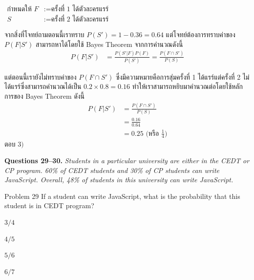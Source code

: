 \documentclass[11pt]{scrartcl}
\newcommand{\groupctx}[2]{\bigskip\noindent\textbf{Questions #1.} \textit{#2}\par\medskip}
\begin{document}
\begin{solutionbox}
  \begin{flushleft}
  $\begin{aligned}
    \text{กำหนดให้ } F &:= \text{ครั้งที่ 1 ได้ตัวละครแรร์} \\
    S &:= \text{ครั้งที่ 2 ได้ตัวละครแรร์}
  \end{aligned}$
  \end{flushleft}

  จากสิ่งที่โจทย์ถามตอนนี้เราทราบ $P(S')=1-0.36=0.64$ แต่โจทย์ต้องการทราบค่าของ $P(F|S')$ สามารถหาได้โดยใช้ Bayes Theorem จากการคำนวณดังนี้
  \begin{align*}
      P(F|S') &= \frac{P(S'|F)P(F)}{P(S')} = \frac{P(F \cap S')}{P(S)}
  \end{align*}

  แต่ตอนนี้เรายังไม่ทราบค่าของ $P(F \cap S')$ ซึ่งมีความหมายคือการสุ่มครั้งที่ 1 ได้แรร์แต่ครั้งที่ 2 ไม่ได้แรร์ซึ่งสามารถคำนวณได้เป็น $0.2 \times 0.8 = 0.16$
  ทำให้เราสามารถหยิบมาคำนวณต่อโดยใช้หลักการของ Bayes Theorem ดังนี้
  \begin{align*}
      P(F|S') &= \frac{P(F \cap S')}{P(S)} \\
              &= \frac{0.16}{0.64} \\
              &= 0.25 \text{ (หรือ $\frac{1}{4}$)}
  \end{align*}
  ตอบ $\boxed{3)}$
\end{solutionbox}

\newpage

\groupctx{29--30}{Students in a particular university are either in the CEDT or CP program. 60\% of CEDT students and 30\% of CP students can write JavaScript. Overall, 48\% of students in this university can write JavaScript.}
 
\begin{problembox}{Problem 29}
If a student can write JavaScript, what is the probability that this student is in CEDT program?
 
\begin{choices}
\item $3/4$
\item $4/5$
\item $5/6$
\item $6/7$
\end{choices}
\end{problembox}
\end{document}

